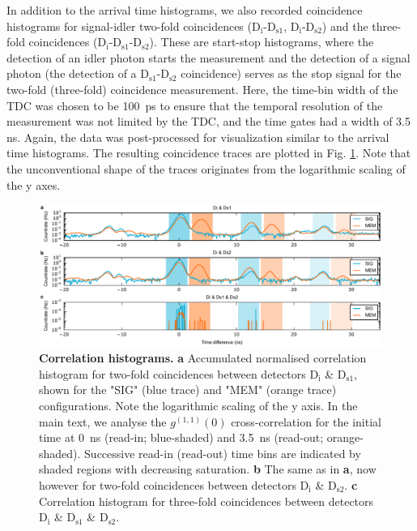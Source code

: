 In addition to the arrival time histograms, we also recorded coincidence histograms for signal-idler two-fold coincidences ($\mathrm{D_i}$-$\mathrm{D_{s1}}$, $\mathrm{D_i}$-$\mathrm{D_{s2}}$) and the three-fold coincidences ($\mathrm{D_i}$-$\mathrm{D_{s1}}$-$\mathrm{D_{s2}}$). These are start-stop histograms, where the detection of an idler photon starts the measurement and the detection of a signal photon (the detection of a $\mathrm{D_{s1}}$-$\mathrm{D_{s2}}$ coincidence) serves as the stop signal for the two-fold (three-fold) coincidence measurement. Here, the time-bin width of the TDC was chosen to be 100~ps to ensure that the temporal resolution of the measurement was not limited by the TDC, and the time gates had a width of 3.5 ns. Again, the data was post-processed for visualization similar to the arrival time histograms. The resulting coincidence traces are plotted in Fig. \ref{fig:correlations}. Note that the unconventional shape of the traces originates from the logarithmic scaling of the y axes.

\begin{figure}
\centering
\includegraphics[width=\linewidth]{supplements_correlation.pdf}
\caption{\textbf{Correlation histograms.} \textbf{a} Accumulated normalised correlation histogram for two-fold coincidences between detectors $\mathrm{D_{i}}$ \& $\mathrm{D_{s1}}$, shown for the "SIG" (blue trace) and "MEM" (orange trace) configurations. Note the logarithmic scaling of the y axis. In the main text, we analyse the $g^{(1,1)}(0)$ cross-correlation for the initial time at 0~ns (read-in; blue-shaded) and 3.5~ns (read-out; orange-shaded). Successive read-in (read-out) time bins are indicated by shaded regions with decreasing saturation. \textbf{b} The same as in \textbf{a}, now however for two-fold coincidences between detectors $\mathrm{D_{i}}$ \& $\mathrm{D_{s2}}$. \textbf{c} Correlation histogram for three-fold coincidences between detectors $\mathrm{D_{i}}$ \& $\mathrm{D_{s1}}$ \& $\mathrm{D_{s2}}$.}
\label{fig:correlations}
\end{figure}

